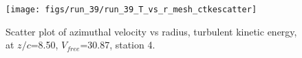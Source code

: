 \begin{figure}[H]
\centering
\texttt{[image: figs/run\_39/run\_39\_T\_vs\_r\_mesh\_ctkescatter]}
\caption{Scatter plot of azimuthal velocity vs radius, turbulent kinetic energy, at $z/c$=8.50, $V_{free}$=30.87, station 4.}
\label{fig:run_39_T_vs_r_mesh_ctkescatter}
\end{figure}


